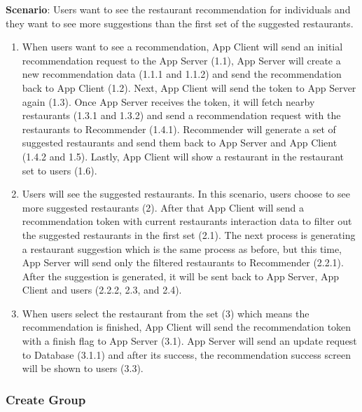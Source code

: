\documentclass[12pt,oneside,openright,a4paper]{cpe-english-project}
\begin{document}
\newpage
\textbf{Scenario}: Users want to see the restaurant recommendation for individuals and they want to see more suggestions than the first set of the suggested restaurants.
\begin{enumerate}
\item When users want to see a recommendation, App Client will send an initial recommendation request to the App Server (1.1), App Server will create a new recommendation data (1.1.1 and 1.1.2) and send the recommendation back to App Client (1.2). Next, App Client will send the token to App Server again (1.3). Once App Server receives the token, it will fetch nearby restaurants (1.3.1 and 1.3.2) and send a recommendation request with the restaurants to Recommender (1.4.1). Recommender will generate a set of suggested restaurants and send them back to App Server and App Client (1.4.2 and 1.5). Lastly, App Client will show a restaurant in the restaurant set to users  (1.6).
\item Users will see the suggested restaurants. In this scenario, users choose to see more suggested restaurants (2). After that App Client will send a recommendation token with current restaurants interaction data to filter out the suggested restaurants in the first set (2.1). The next process is generating a restaurant suggestion which is the same process as before, but this time, App Server will send only the filtered restaurants to Recommender (2.2.1). After the suggestion is generated, it will be sent back to App Server, App Client and users (2.2.2, 2.3, and 2.4).
\item When users select the restaurant from the set (3) which means the recommendation is finished, App Client will send the recommendation token with a finish flag to App Server (3.1). App Server will send an update request to Database (3.1.1) and after its success, the recommendation success screen will be shown to users (3.3).
\end{enumerate}



\newpage

\subsubsection{Create Group}
\end{document}
